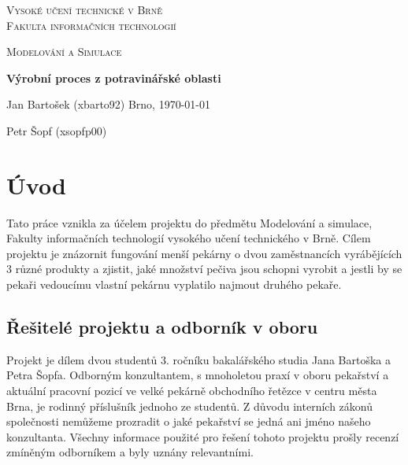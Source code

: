 \documentclass[11pt]{article}
\newcommand{\mydate}{\today}
\begin{document}
\begin{center}
        {\Huge
        \textsc{Vysoké učení technické v Brně} \\
        \medskip
      \huge{\textsc{Fakulta informačních technologií}}
         }\\
      \end{center}
      
  \vspace{10pt}      	
     
    
  \vspace{40pt}	  	
    
    \begin{center}
    {\Huge
    \textsc{Modelování a Simulace}
    }
    
    \vspace{20pt}		
      
    {\Huge
      \textbf{Výrobní proces z potravinářské oblasti}
    }

    \vspace{50pt}			
    

    
    \end{center}
  	
    
    {\Large 
      Jan Bartošek (xbarto92) \hfill Brno, \mydate
      \newline \par
      Petr Šopf (xsopfp00)
    }	  	

    \vspace{150pt}


\section{Úvod}
Tato práce vznikla za účelem projektu do předmětu Modelování a simulace, Fakulty informačních technologií vysokého učení technického v Brně. Cílem projektu je znázornit fungování menší pekárny o dvou zaměstnancích vyrábějících 3 různé produkty a zjistit, jaké množství pečiva jsou schopni vyrobit a jestli by se pekaři vedoucímu vlastní pekárnu vyplatilo najmout druhého pekaře.

\subsection{Řešitelé projektu a odborník v oboru}
Projekt je dílem dvou studentů 3. ročníku bakalářského studia Jana Bartoška a Petra Šopfa. Odborným konzultantem, s mnoholetou praxí v oboru pekařství a aktuální pracovní pozicí ve velké pekárně obchodního řetězce v centru města Brna, je rodinný příslušník jednoho ze studentů. Z důvodu interních zákonů společnosti nemůžeme prozradit o jaké pekařství se jedná ani jméno našeho konzultanta. Všechny informace použité pro řešení tohoto projektu prošly recenzí zmíněným odborníkem a byly uznány relevantními.
\end{document}
